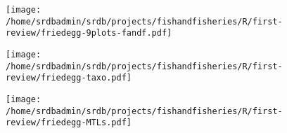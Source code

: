\begin{landscape}
\begin{figure}
\begin{center}
\texttt{[image: /home/srdbadmin/srdb/projects/fishandfisheries/R/first-review/friedegg-9plots-fandf.pdf]}
\end{center}
\caption{ }\label{fig:friedegg}
\end{figure}
\end{landscape}

\begin{figure}
\begin{center}
\texttt{[image: /home/srdbadmin/srdb/projects/fishandfisheries/R/first-review/friedegg-taxo.pdf]}
\end{center}
\caption{ }
\label{fig:taxo}
\end{figure}

\begin{figure}
\begin{center}
\texttt{[image: /home/srdbadmin/srdb/projects/fishandfisheries/R/first-review/friedegg-MTLs.pdf]}
\end{center}
\caption{ }
\label{fig:mtl}
\end{figure}





